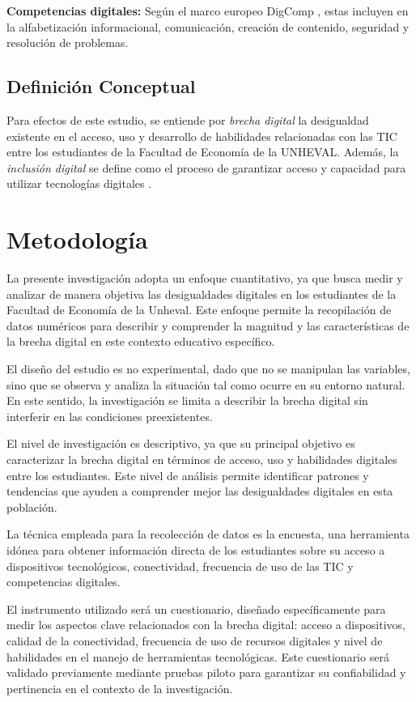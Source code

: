 \documentclass[12pt, a4paper]{article}
\begin{document}
\textbf{Competencias digitales:} Según el marco europeo DigComp \parencite{ferrari2013}, estas incluyen en la alfabetización informacional, comunicación, creación de contenido, seguridad y resolución de problemas.

\subsection{Definición Conceptual}

Para efectos de este estudio, se entiende por \textit{brecha digital} la desigualdad existente en el acceso, uso y desarrollo de habilidades relacionadas con las TIC entre los estudiantes de la Facultad de Economía de la UNHEVAL. Además, la \textit{inclusión digital} se define como el proceso de garantizar acceso y capacidad para utilizar tecnologías digitales \parencite{unesco2019}.


\section{Metodología}

La presente investigación adopta un enfoque cuantitativo, ya que busca medir y analizar de manera objetiva las desigualdades digitales en los estudiantes de la Facultad de Economía de la Unheval. Este enfoque permite la recopilación de datos numéricos para describir y comprender la magnitud y las características de la brecha digital en este contexto educativo específico.  

El diseño del estudio es no experimental, dado que no se manipulan las variables, sino que se observa y analiza la situación tal como ocurre en su entorno natural. En este sentido, la investigación se limita a describir la brecha digital sin interferir en las condiciones preexistentes.  

El nivel de investigación es descriptivo, ya que su principal objetivo es caracterizar la brecha digital en términos de acceso, uso y habilidades digitales entre los estudiantes. Este nivel de análisis permite identificar patrones y tendencias que ayuden a comprender mejor las desigualdades digitales en esta población.  

La técnica empleada para la recolección de datos es la encuesta, una herramienta idónea para obtener información directa de los estudiantes sobre su acceso a dispositivos tecnológicos, conectividad, frecuencia de uso de las TIC y competencias digitales.  

El instrumento utilizado será un cuestionario, diseñado específicamente para medir los aspectos clave relacionados con la brecha digital: acceso a dispositivos, calidad de la conectividad, frecuencia de uso de recursos digitales y nivel de habilidades en el manejo de herramientas tecnológicas. Este cuestionario será validado previamente mediante pruebas piloto para garantizar su confiabilidad y pertinencia en el contexto de la investigación.  
\end{document}
